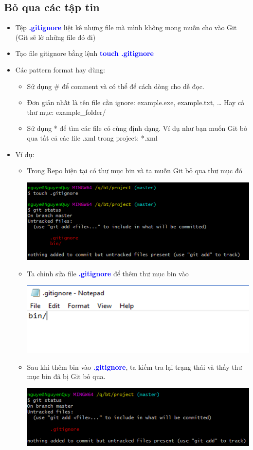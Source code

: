 \documentclass[12pt,a4paper]{report}
\begin{document}
\subsection{Bỏ qua các tập tin}
\begin{itemize}
\item Tệp \textcolor{blue}{\bf .gitignore} liệt kê những file mà mình không mong muốn cho vào Git (Git sẽ lờ những file đó đi)
\item Tạo file gitignore bằng lệnh \textcolor{blue}{\bf touch .gitignore}
\item Các pattern format hay dùng:
	\begin{itemize}
	\item Sử dụng \# để comment và có thể để cách dòng cho dễ đọc. 
	\item Đơn giản nhất là tên file cần ignore: example.exe, example.txt, …
	Hay cả thư mục: example\_folder/
	\item Sử dụng * để tìm các file có cùng định dạng. Ví dụ như bạn muốn Git bỏ qua tất cả các file .xml trong project: *.xml
	\end{itemize}
\item Ví dụ: 
\begin{itemize}
\item Trong Repo hiện tại có thư mục bin và ta muốn Git bỏ qua thư mục đó

	\includegraphics[width=0.8\linewidth]{screenshot009}

	\label{fig:screenshot009}

\item Ta chỉnh sửa file \textcolor{blue}{\bf .gitignore }để thêm thư mục bin vào

	\includegraphics[width=0.8\linewidth]{screenshot010}
	
	\label{fig:screenshot010}

\item Sau khi thêm bin vào \textcolor{blue}{\bf .gitignore}, ta kiếm tra lại trạng thái và thấy thư mục bin đã bị Git bỏ qua.

	\includegraphics[width=0.8\linewidth]{screenshot011}

	\label{fig:screenshot011}
\end{itemize}
\end{itemize}
\end{document}
